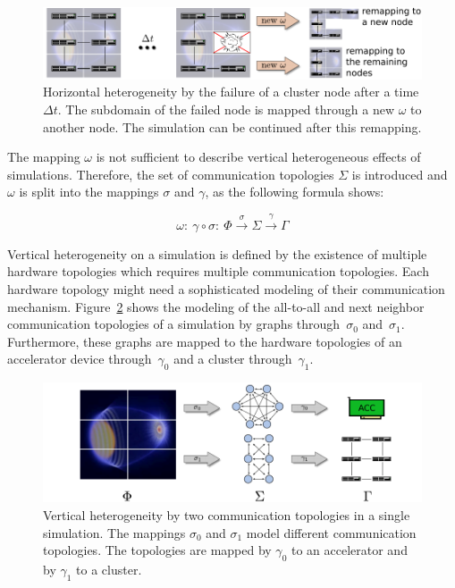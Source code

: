\begin{figure}[H]
  \centering \includegraphics[width=\textwidth]{graphics/30_resilience}
  \caption{Horizontal heterogeneity by the failure of a cluster node after
    a time $\Delta t$. The subdomain of the failed node is mapped
    through a new $\omega$ to another node. The simulation can be
    continued after this remapping.}
  \label{fig:resilience}
\end{figure}

\noindent The mapping $\omega$ is not sufficient to describe vertical
heterogeneous effects of simulations. Therefore, the set of
communication topologies $\Sigma$ is introduced and $\omega$ is split
into the mappings $\sigma$ and $\gamma$, as the following formula
shows:

\[\omega:~\gamma \circ \sigma:~\Phi \xrightarrow{\sigma} \Sigma \xrightarrow{\gamma} \Gamma\]

\noindent Vertical heterogeneity on a simulation is defined by the existence
of multiple hardware topologies which requires multiple communication
topologies. Each hardware topology might need
a sophisticated modeling of their communication
mechanism. Figure~\ref{fig:vertical_hetero} shows the modeling of the
all-to-all and next neighbor communication topologies of a simulation
by graphs through~$\sigma_0$ and~$\sigma_1$.  Furthermore, these
graphs are mapped to the hardware topologies of an accelerator device
through~$\gamma_0$ and a cluster through~$\gamma_1$. 

\begin{figure}[H]
  \centering \includegraphics[width=\textwidth]{graphics/30_vertical_hetero}
  \caption{Vertical heterogeneity by two communication topologies in a
    single simulation. The mappings $\sigma_0$ and $\sigma_1$ model
    different communication topologies. The topologies are mapped by
    $\gamma_0$ to an accelerator and by $\gamma_1$ to a cluster.}
  \label{fig:vertical_hetero}
\end{figure}


